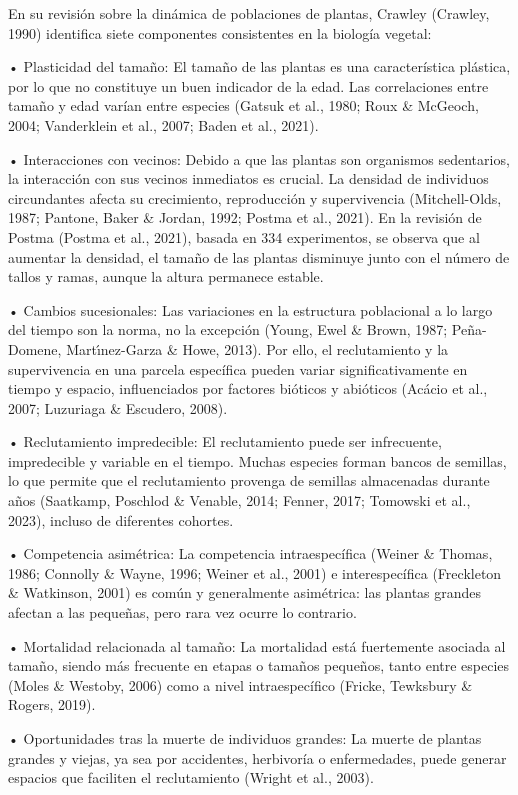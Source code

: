 \documentclass[
  12pt,
  letterpaper,
]{book}
\begin{document}
En su revisión sobre la dinámica de poblaciones de plantas, Crawley
(Crawley, 1990) identifica siete componentes consistentes en la biología
vegetal:

• Plasticidad del tamaño: El tamaño de las plantas es una característica
plástica, por lo que no constituye un buen indicador de la edad. Las
correlaciones entre tamaño y edad varían entre especies (Gatsuk et al.,
1980; Roux \& McGeoch, 2004; Vanderklein et al., 2007; Baden et al.,
2021).

• Interacciones con vecinos: Debido a que las plantas son organismos
sedentarios, la interacción con sus vecinos inmediatos es crucial. La
densidad de individuos circundantes afecta su crecimiento, reproducción
y supervivencia (Mitchell-Olds, 1987; Pantone, Baker \& Jordan, 1992;
Postma et al., 2021). En la revisión de Postma (Postma et al., 2021),
basada en 334 experimentos, se observa que al aumentar la densidad, el
tamaño de las plantas disminuye junto con el número de tallos y ramas,
aunque la altura permanece estable.

• Cambios sucesionales: Las variaciones en la estructura poblacional a
lo largo del tiempo son la norma, no la excepción (Young, Ewel \& Brown,
1987; Peña-Domene, Martı́nez-Garza \& Howe, 2013). Por ello, el
reclutamiento y la supervivencia en una parcela específica pueden variar
significativamente en tiempo y espacio, influenciados por factores
bióticos y abióticos (Acácio et al., 2007; Luzuriaga \& Escudero, 2008).

• Reclutamiento impredecible: El reclutamiento puede ser infrecuente,
impredecible y variable en el tiempo. Muchas especies forman bancos de
semillas, lo que permite que el reclutamiento provenga de semillas
almacenadas durante años (Saatkamp, Poschlod \& Venable, 2014; Fenner,
2017; Tomowski et al., 2023), incluso de diferentes cohortes.

• Competencia asimétrica: La competencia intraespecífica (Weiner \&
Thomas, 1986; Connolly \& Wayne, 1996; Weiner et al., 2001) e
interespecífica (Freckleton \& Watkinson, 2001) es común y generalmente
asimétrica: las plantas grandes afectan a las pequeñas, pero rara vez
ocurre lo contrario.

• Mortalidad relacionada al tamaño: La mortalidad está fuertemente
asociada al tamaño, siendo más frecuente en etapas o tamaños pequeños,
tanto entre especies (Moles \& Westoby, 2006) como a nivel
intraespecífico (Fricke, Tewksbury \& Rogers, 2019).

• Oportunidades tras la muerte de individuos grandes: La muerte de
plantas grandes y viejas, ya sea por accidentes, herbivoría o
enfermedades, puede generar espacios que faciliten el reclutamiento
(Wright et al., 2003).
\end{document}
